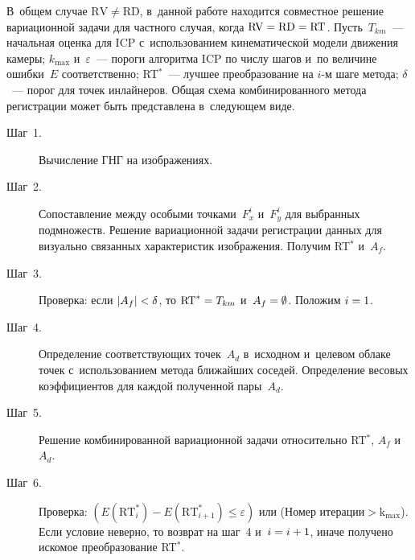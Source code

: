 \begin{multicols}{2}
В~общем 
случае $\mathrm{RV}\not= \mathrm{RD}$, в~данной работе находится совместное решение 
вариационной задачи для част\-но\-го случая, когда $\mathrm{RV}\hm= \mathrm{RD}
\hm= \mathrm{RT}$. Пусть~${T}_{km}$~--- начальная оценка для ICP с~использованием 
кинематической модели движения камеры; ${k}_{\max}$  
и~$\varepsilon$~--- пороги алгоритма ICP по числу шагов и~по величине 
ошибки~${E}$ соответственно; RT$^*$~--- лучшее преобразование на 
$i$-м шаге метода; $\delta$~--- порог для точек ин\-лай\-не\-ров. Общая схема 
комбинированного метода регистрации может быть представлена в~сле\-ду\-ющем 
виде.
\begin{description}
\item[Шаг~1.] Вычисление ГНГ на 
изображениях.
\item[Шаг~2.] Сопоставление между особыми точками~$F_x^i$ и~$F_y^i$ для 
выбранных подмножеств. Решение вариационной задачи регистрации данных 
для визуально связанных характеристик изоб\-ра\-же\-ния. Получим RT$^*$ 
и~${A}_{{f}}$.
\item[Шаг~3.] Проверка: если $\vert {A}_{{f}} \vert \hm <\delta$, 
то $\mathrm{RT}^* \hm={T}_{{km}}$ 
и~${A}_{{f}}\hm=\emptyset$. Положим $i\hm = 1$.
\item[Шаг~4.] Определение соответствующих 
точек~${A}_{{d}}$ в~исходном и~целевом облаке точек 
с~использованием метода ближайших соседей. Определение весовых 
коэффициентов для каж\-дой полученной пары~${A}_{{d}}$.
\item[Шаг~5.] Решение комбинированной вариационной задачи относительно 
RT$^*$, ${A}_{{f}}$ и~${A}_{d}$.
\item[Шаг~6.] Проверка: $({E}(\mathrm{RT}^*_i)-
{E}(\mathrm{RT}^*_{i+1})\leq \varepsilon)$ или (Номер  
ите\-ра\-ции\;$>$\;$\mathrm{k}_{\max}$). Если условие неверно, то возврат на 
шаг~4 и~$i \hm= i \hm+ 1$, иначе получено искомое преобразование RT$^*$.
\end{description}
  

\end{multicols}

